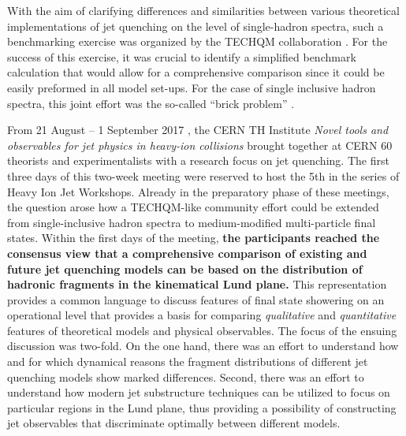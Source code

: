 With the aim of clarifying differences and similarities between various theoretical implementations of jet quenching on the level of single-hadron spectra, such a benchmarking exercise was organized by the TECHQM collaboration \cite{TECHQM}. For the success of this exercise, it was crucial to identify a simplified 
benchmark calculation that would allow for a comprehensive comparison since it could be easily preformed in all model set-ups. For the case of single inclusive
hadron spectra, this joint effort was the so-called ``brick problem'' \cite{Armesto:2011ht,Burke:2013yra}.

From 21 August -- 1 September 2017 \cite{THinst}, the CERN TH Institute  {\sl Novel tools and observables for jet physics in heavy-ion collisions} brought 
together at CERN 60 theorists and experimentalists with a research focus on jet quenching. The first three days of this two-week meeting were reserved 
to host the 5th in the series of Heavy Ion Jet Workshops.
Already in the preparatory phase of these meetings, the question arose how a TECHQM-like community 
effort could be extended from single-inclusive hadron spectra to medium-modified multi-particle final states. Within the first days of the meeting, {\bf the 
participants reached the consensus view that a comprehensive comparison of existing and future jet quenching models can be based on the
distribution of hadronic fragments in the kinematical Lund plane.} 
This representation provides a common language to discuss features of final state showering on an operational level that provides a basis for comparing {\sl qualitative} and {\sl quantitative} features of theoretical models and physical observables.
The focus of the ensuing discussion was two-fold. On the one hand, there was an effort to understand
how and for which dynamical reasons the fragment distributions of different jet quenching models show marked differences. Second, there was an
effort to understand how modern jet substructure techniques can be utilized to focus on particular regions in the Lund plane, thus providing a possibility of
constructing jet observables that discriminate optimally between different models. 

